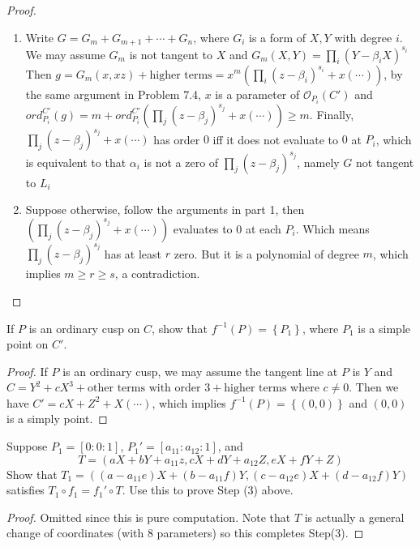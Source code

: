 \documentclass{solution}
\begin{document}
\begin{proof}
    \begin{enumerate}
        \item Write $G = G_m + G_{m + 1}+ \cdots + G_{n}$, where $G_i$ is a form of $X, Y$ with degree $i$. We may assume $G_m$ is not tangent to $X$ and $G_m(X, Y) = \prod\limits_{i} (Y - \beta_i X)^{s_i}$ Then $g = G_m(x, xz)  + \text{higher terms} = x^m (\prod\limits_{i} (z - \beta_i)^{s_i} + x(\cdots))$, by the same argument in Problem 7.4, $x$ is a parameter of $\mathcal{O}_{P_i}(C')$ and $ord_{P_i}^{C'}(g) = m + ord_{P_i}^{C'}(\prod\limits_{j} (z - \beta_j)^{s_j} + x(\cdots)) \ge m$. Finally, $\prod\limits_{j} (z - \beta_j)^{s_j} + x(\cdots)$ has order $0$ iff it does not evaluate to $0$ at $P_i$, which is equivalent to that $\alpha_i$ is not a zero of $\prod\limits_{j} (z - \beta_j)^{s_j}$, namely $G$ not tangent to $L_i$
        \item Suppose otherwise, follow the arguments in part 1, then $(\prod\limits_{j} (z - \beta_j)^{s_j} + x(\cdots))$ evaluates to $0$ at each $P_i$. Which means $\prod\limits_{j} (z - \beta_j)^{s_j}$ has at least $r$ zero. But it is a polynomial of degree $m$, which implies $m \ge r \ge s$, a contradiction.
    \end{enumerate}
\end{proof}

\begin{problem}{7.6}
    If $P$ is an ordinary cusp on $C$, show that $f ^{-1}(P) = \left\lbrace P_1 \right\rbrace$, where $P_1$ is a simple point on $C'$.
\end{problem}

\begin{proof}
    If $P$ is an ordinary cusp, we may assume the tangent line at $P$ is $Y$ and $C = Y^2 + cX^3 + \text {other terms with order $3$} +\text{higher terms}$ where $c \ne 0$. Then we have $C' = cX + Z^2 + X(\cdots)$, which implies $f ^{-1}(P) = \left\lbrace (0, 0) \right\rbrace$ and $(0, 0)$ is a simply point.
\end{proof}

\begin{problem}{7.7}
    Suppose $P_1 = [0:0:1]$, $P_1' = [a_{11}:a_{12}:1]$, and
    $$T = (aX + bY + a_{11}z, cX + dY + a_{12}Z, eX + fY + Z)$$
    Show that $T_1 = ((a - a_{11}e)X + (b - a_{11}f)Y, (c - a_{12}e)X + (d - a_{12}f)Y)$ satisfies $T_1 \circ f_1 = f_1' \circ T$. Use this to prove Step (3) above.
\end{problem}

\begin{proof}
    Omitted since this is pure computation. Note that $T$ is actually a general change of coordinates (with $8$ parameters) so this completes Step(3).
\end{proof}
\end{document}

